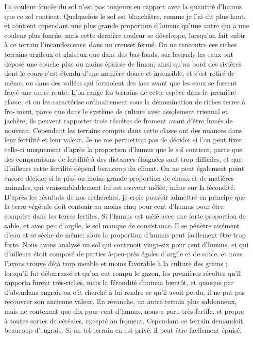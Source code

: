 La couleur foncée du sol n'est pas toujours en rapport avec la quantité d'humus que ce sol contient. Quelquefois le sol est blanchâtre, comme je l'ai dit plus haut, et contient cependant une plus grande proportion d'humus qu'une autre qui a une couleur plus foncée; mais cette dernière couleur se développe, lorsqu'on fait subir à ce terrain l'incandescence\dag\ dans un creuset fermé.
On ne rencontre ces riches terrains argileux et glaiseux que dans des bas-fonds, sur lesquels les eaux ont déposé une couche plus ou moins épaisse de limon; ainsi qu'au bord des rivières dont le cours s'est étendu d'une manière douce et insensible, et s'est retiré de même, ou dans des vallées qui formoient des lacs avant que les eaux se fussent frayé une autre route. L'on range les terrains de cette espèce dans la première classe, et on les caractérise ordinairement sous la dénomination de riches terres à fro-\setcounter{page}{104} ment, parce que dans le système de culture avec assolement triennal et jachère, ils peuvent rapporter trois récoltes de froment avant d'être fumés de nouveau. Cependant les terrains compris dans cette classe ont des nuances dans leur fertilité et leur valeur. Je ne me permettrai pas de décider si l'on peut fixer celle-ci uniquement d'après la proportion d'humus que le sol contient, parce que des comparaisons de fertilité à des distances éloignées sont trop difficiles, et que d'ailleurs cette fertilité dépend beaucoup du climat. On ne peut également point encore décider si la plus ou moins grande proportion de chaux et de matières animales, qui vraisemblablement lui est souvent mêlée, influe sur la fécondité. D'après les résultats de nos recherches, je crois pouvoir admettre en principe que la terre végétale doit contenir au moins cinq pour cent d'humus pour être comprise dans les terres fertiles. Si l'humus est mêlé avec une forte proportion de sable, et avec peu d'argile, le sol manque de consistance. Il se pénètre aisément d'eau et se sèche de même; alors la proportion d'humus peut facilement être trop forte. Nous avons analysé un sol qui contenoit vingt-six pour cent d'humus, et\setcounter{page}{105} qui d'ailleurs étoit composé de parties à-peu-près égales d'argile et de sable, et nous l'avons trouvé déjà trop meuble et moins favorable à la culture des grains ; lorsqu'il fut débarrassé et qu'on eut rompu le gazon, les premières récoltes qu'il rapporta furent très-riches, mais la fécondité diminua bientôt, et quoique par d'abondans engrais on eût cherché à lui rendre ce qu'il avoit perdu, il ne put pas recouvrer son ancienne valeur.
En revanche, un autre terrain plus sablonneux, mais ne contenant que dix pour cent d'humus, nous a paru très-fertile, et propre à toutes sortes de céréales, excepté au froment. Cependant ce terrain demandoit beaucoup d'engrais. Si un tel terrain en est privé, il peut être facilement épuisé.
